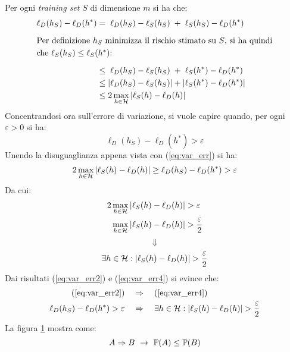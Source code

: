 Per ogni \textit{training set} $S$ di dimensione $m$ si ha che:
\begin{align}
    \ell_D(h_S)-\ell_D(h^*) &= \phantom{|}\ell_D(h_S)-\ell_S(h_S)\phantom{|}
                +\phantom{|}\ell_S(h_S)-\ell_D(h^*) \notag\\[.6em]
                \multispan2{Per definizione $h_S$ minimizza il rischio stimato su $S$,
                si ha quindi\hfill}\notag\\
                \multispan2{che $\ell_S(h_S)\leq\ell_S(h^*)$:
                \hfill}\notag\\[.6em]
           &\leq\phantom{|}\ell_D(h_S)-\ell_S(h_S)\phantom{|}+\phantom{|}
                \ell_S(h^*)-\ell_D(h^*)\phantom{|} \notag\\
           &\leq |\ell_D(h_S)-\ell_S(h_S)|+|\ell_S(h^*)-\ell_D(h^*)| \notag\\
           &\leq 2\max_{h \in \Hpred} |\ell_S(h)-\ell_D(h)| \label{eq:var_err}
\end{align}
Concentrandosi ora sull'errore di variazione, si vuole capire quando, per ogni
$\varepsilon > 0$ si ha:
\begin{equation}
\ell_D(h_S)-\ell_D(h^*)>\varepsilon
\label{eq:var_err2}
\end{equation}
Unendo la disuguaglianza appena vista con (\ref{eq:var_err}) si ha:
$$
2\max_{h \in \mathcal{H}} |\ell_S(h)-\ell_D(h)| \geq \ell_D(h_S)-\ell_D(h^*)
> \varepsilon
$$
Da cui:
\begin{align}
    2\max_{h \in \mathcal{H}} |\ell_S(h)-\ell_D(h)| &> \varepsilon\notag\\
    \max_{h \in \mathcal{H}} |\ell_S(h)-\ell_D(h)| &> \frac{\varepsilon}{2}\label{eq:var_err3}
\end{align}
$$ \Downarrow $$
\begin{equation}
    \exists h \in \mathcal{H} : |\ell_S(h)-\ell_D(h)| > \frac{\varepsilon}{2}
    \label{eq:var_err4}
\end{equation}
Dai risultati (\ref{eq:var_err2}) e (\ref{eq:var_err4}) si evince che:
\begin{align}
    (\ref{eq:var_err2}) \quad &\Rightarrow \quad (\ref{eq:var_err4})\notag\\
    \ell_D(h_S)-\ell_D(h^*)>\varepsilon 
    \quad &\Rightarrow \quad \exists h \in \mathcal{H} : |\ell_S(h)-\ell_D(h)|
    > \frac{\varepsilon}{2}\label{eq:var_err5}
\end{align}
La figura \ref{fig:prob_implication} mostra come:
\begin{equation}
    A \Rightarrow B \ \rightarrow \ \mathbb{P}(A) \leq \mathbb{P}(B) \label{eq:prob_impl}
\end{equation}
\begin{figure}[ht]
    \centering
    
    \caption{\label{fig:prob_implication}}
\end{figure}

